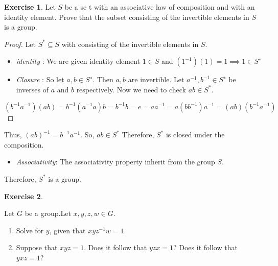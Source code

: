 \documentclass[
]{book}
\providecommand{\tightlist}{%
  \setlength{\itemsep}{0pt}\setlength{\parskip}{0pt}}
\theoremstyle{definition}
\theoremstyle{definition}
\theoremstyle{definition}
\newtheorem{exercise}{Exercise}[chapter]
\theoremstyle{definition}
\theoremstyle{remark}
\begin{document}
\begin{exercise}
\protect\hypertarget{exr:unnamed-chunk-62}{}\label{exr:unnamed-chunk-62}Let \(S\) be a se t with an associative law of composition and with an identity element. Prove that the subset consisting of the invertible elements in \(S\) is a group.
\end{exercise}

\begin{proof}
Let \(S^*\subseteq S\) with consisting of the invertible elements in \(S\).

\begin{itemize}
\item
  \emph{identity} : We are given identity element \(1 \in S\) and \((1^{−1})(1)=1 \implies 1 \in S^∗\)
\item
  \emph{Closure} :
  So let \(a,b\in S^∗\). Then \(a,b\) are invertible. Let \(a^{−1},b^{−1}\in S^∗\) be inverses of \(a\) and \(b\) respectively. Now we need to check \(ab\in S^*\).\\
\end{itemize}

\[(b^{−1}a^{−1})(ab)=b^{−1}(a^{−1}a)b=b^{−1}b=e=
  aa^{-1}=a(bb^{−1})a^{−1}=(ab)(b^{−1}a^{−1})\]
\end{proof}

Thus, \((ab)^{−1}=b^{−1}a^{−1}\). So, \(ab\in S^*\)
Therefore, \(S^*\) is closed under the composition.

\begin{itemize}
\tightlist
\item
  \emph{Associativity}: The associativity property inherit from the group \(S\).
\end{itemize}

Therefore, \(S^*\) is a group.

\begin{exercise}
\protect\hypertarget{exr:unnamed-chunk-64}{}\label{exr:unnamed-chunk-64}

Let \(G\) be a group.Let \(x, y, z,w \in G\).

\begin{enumerate}
\def\labelenumi{(\alph{enumi})}
\tightlist
\item
  Solve for \(y\), given that \(xyz^{-1}w = 1\).
\item
  Suppose that \(xyz = 1\). Does it follow that \(yzx = 1\)? Does it follow that \(yxz = 1\)?
\end{enumerate}

\end{exercise}
\end{document}
